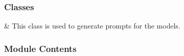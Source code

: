 \documentclass[letterpaper,10pt,english]{sphinxmanual}
\begin{document}
\subsubsection{Classes}
\label{\detokenize{autoapi/prompt/index:classes}}

\begin{savenotes}\sphinxattablestart
\sphinxthistablewithglobalstyle
\sphinxthistablewithnovlinesstyle
\centering
\begin{tabulary}{\linewidth}[t]{}
\sphinxtoprule
\sphinxtableatstartofbodyhook
\sphinxAtStartPar
{}
&
\sphinxAtStartPar
This class is used to generate prompts for the models.
\\
\sphinxbottomrule
\end{tabulary}
\sphinxtableafterendhook\par
\sphinxattableend\end{savenotes}


\subsubsection{Module Contents}
\label{\detokenize{autoapi/prompt/index:module-contents}}
\end{document}
